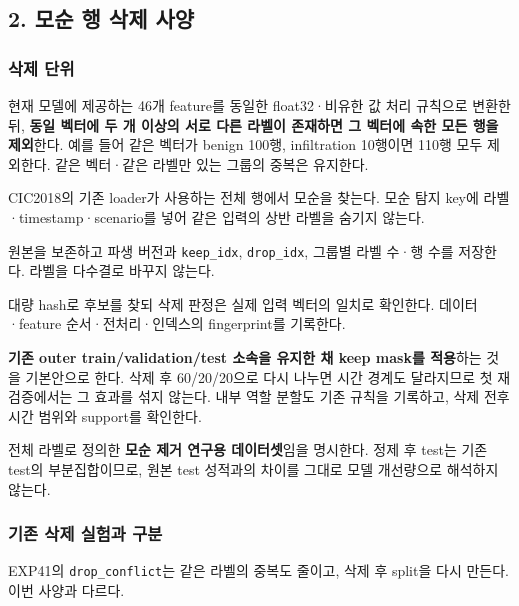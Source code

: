 \subsection{2. 모순 행 삭제 사양}
\subsubsection{삭제 단위}
현재 모델에 제공하는 46개 feature를 동일한 float32·비유한 값 처리 규칙으로 변환한 뒤, \textbf{동일 벡터에 두 개 이상의 서로 다른 라벨이 존재하면 그 벡터에 속한 모든 행을 제외}한다. 예를 들어 같은 벡터가 benign 100행, infiltration 10행이면 110행 모두 제외한다. 같은 벡터·같은 라벨만 있는 그룹의 중복은 유지한다.

\par\noindent \textbullet\enspace CIC2018의 기존 loader가 사용하는 전체 행에서 모순을 찾는다. 모순 탐지 key에 라벨·timestamp·scenario를 넣어 같은 입력의 상반 라벨을 숨기지 않는다.


\par\noindent \textbullet\enspace 원본을 보존하고 파생 버전과 \texttt{keep\_\allowbreak{}\allowbreak{}idx\allowbreak{}}, \texttt{drop\_\allowbreak{}\allowbreak{}idx\allowbreak{}}, 그룹별 라벨 수·행 수를 저장한다. 라벨을 다수결로 바꾸지 않는다.


\par\noindent \textbullet\enspace 대량 hash로 후보를 찾되 삭제 판정은 실제 입력 벡터의 일치로 확인한다. 데이터·feature 순서·전처리·인덱스의 fingerprint를 기록한다.


\par\noindent \textbullet\enspace \textbf{기존 outer train/\allowbreak{}validation/\allowbreak{}test 소속을 유지한 채 keep mask를 적용}하는 것을 기본안으로 한다. 삭제 후 60/\allowbreak{}20/\allowbreak{}20으로 다시 나누면 시간 경계도 달라지므로 첫 재검증에서는 그 효과를 섞지 않는다. 내부 역할 분할도 기존 규칙을 기록하고, 삭제 전후 시간 범위와 support를 확인한다.


\par\noindent \textbullet\enspace 전체 라벨로 정의한 \textbf{모순 제거 연구용 데이터셋}임을 명시한다. 정제 후 test는 기존 test의 부분집합이므로, 원본 test 성적과의 차이를 그대로 모델 개선량으로 해석하지 않는다.


\subsubsection{기존 삭제 실험과 구분}
\par\noindent \textbullet\enspace EXP41의 \texttt{drop\_\allowbreak{}\allowbreak{}con\allowbreak{}flict}는 같은 라벨의 중복도 줄이고, 삭제 후 split을 다시 만든다. 이번 사양과 다르다.


